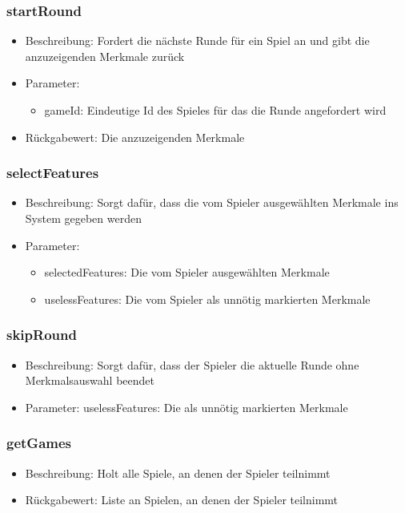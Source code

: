 \documentclass[a4paper]{scrreprt}
\begin{document}
    \subsubsection{startRound}
    \begin{itemize}
        \item Beschreibung: Fordert die nächste Runde für ein Spiel an und gibt die anzuzeigenden Merkmale zurück
        \item Parameter:
        \begin{itemize}
            \item gameId: Eindeutige Id des Spieles für das die Runde angefordert wird
        \end{itemize}
        \item Rückgabewert: Die anzuzeigenden Merkmale
    \end{itemize}
    \subsubsection{selectFeatures}
    \begin{itemize}
        \item Beschreibung: Sorgt dafür, dass die vom Spieler ausgewählten Merkmale ins System gegeben werden
        \item Parameter:
        \begin{itemize}
            \item selectedFeatures: Die vom Spieler ausgewählten Merkmale
            \item uselessFeatures: Die vom Spieler als unnötig markierten Merkmale
        \end{itemize}
    \end{itemize}
    \subsubsection{skipRound}
    \begin{itemize}
        \item Beschreibung: Sorgt dafür, dass der Spieler die aktuelle Runde ohne Merkmalsauswahl beendet
        \item Parameter: uselessFeatures: Die als unnötig markierten Merkmale
    \end{itemize}
    \subsubsection{getGames}
    \begin{itemize}
        \item Beschreibung: Holt alle Spiele, an denen der Spieler teilnimmt
        \item Rückgabewert: Liste an Spielen, an denen der Spieler teilnimmt
    \end{itemize}
\end{document}
